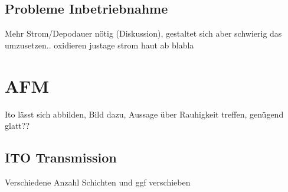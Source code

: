 \subsection{Probleme Inbetriebnahme}
Mehr Strom/Depodauer nötig (Diskussion), gestaltet sich aber schwierig das umzusetzen.. oxidieren justage strom haut ab blabla
\section{AFM}
Ito lässt sich abbilden, Bild dazu, Aussage über Rauhigkeit treffen, genügend glatt?? \


\subsection{ITO Transmission}

Verschiedene Anzahl Schichten und ggf verschieben
